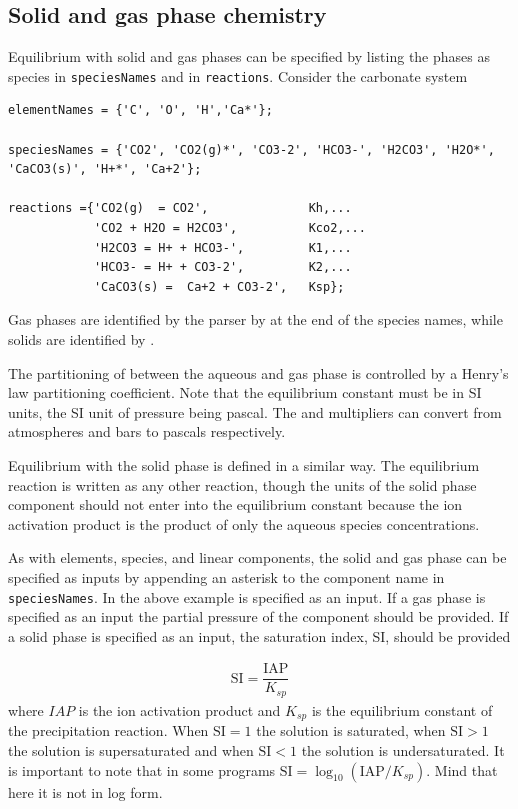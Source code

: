 \documentclass{article}
\begin{document}
\subsection{Solid and gas phase chemistry}

Equilibrium with solid and gas phases can be specified by listing the phases as species in \verb|speciesNames| and in \verb|reactions|. Consider the carbonate system

\begin{lstlisting}
elementNames = {'C', 'O', 'H','Ca*'};

speciesNames = {'CO2', 'CO2(g)*', 'CO3-2', 'HCO3-', 'H2CO3', 'H2O*', 'CaCO3(s)', 'H+*', 'Ca+2'};

reactions ={'CO2(g)  = CO2',              Kh,...
            'CO2 + H2O = H2CO3',          Kco2,...
            'H2CO3 = H+ + HCO3-',         K1,...
            'HCO3- = H+ + CO3-2',         K2,...
            'CaCO3(s) =  Ca+2 + CO3-2',   Ksp};   
\end{lstlisting}
Gas phases are identified by the parser by  at the end of the species names, while solids are identified by . 

The partitioning of  between the aqueous and gas phase is controlled by a Henry's law partitioning coefficient. Note that the equilibrium constant must be in SI units, the SI unit of pressure being pascal. The  and  multipliers can convert from atmospheres and bars to pascals respectively. 

Equilibrium with the solid phase is defined in a similar way. The equilibrium reaction is written as any other reaction, though the units of the solid phase component should not enter into the equilibrium constant because the ion activation product is the product of only the aqueous species concentrations.

As with elements, species, and linear components, the solid and gas phase can be specified as inputs by appending an asterisk to the component name in \verb|speciesNames|. In the above example  is specified as an input. If a gas phase is specified as an input the partial pressure of the component should be provided. If a solid phase is specified as an input, the saturation index, SI, should be provided

\begin{align}
    \text{SI} = \dfrac{\text{IAP}}{K_{sp}}
\end{align}
where $IAP$ is the ion activation product and $K_{sp}$ is the equilibrium constant of the precipitation reaction. When $\text{SI} = 1$ the solution is saturated, when $\text{SI}>1$ the solution is supersaturated and when $\text{SI}<1$ the solution is undersaturated. It is important to note that in some programs $\text{SI} = \log_{10}(\text{IAP}/K_{sp})$. Mind that here it is not in log form. 
\end{document}
